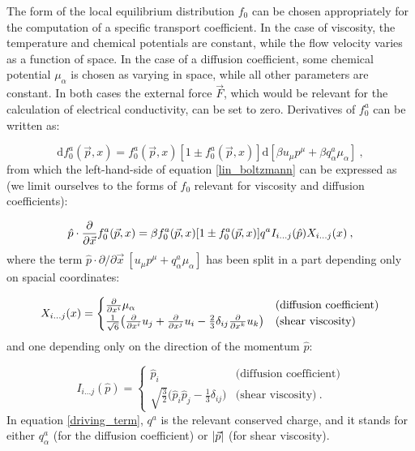 The form of the local equilibrium distribution $f_0$ can be chosen appropriately for the computation of a specific transport coefficient. In the case of viscosity, the temperature and chemical potentials are constant, while the flow velocity varies as a function of space. In the case of a diffusion coefficient, some chemical potential $\mu_{\alpha}$ is chosen as varying in space, while all other parameters are constant. In both cases the external force $\vec F$, which would be relevant for the calculation of electrical conductivity, can be set to zero. Derivatives of $f_0^a$ can be written as:

\begin{equation}
\mathrm d f_0^a(\vec p,x) = f_0^a(\vec p,x) [1 \pm f_0^a(\vec p,x)] \mathrm d [\beta u_{\mu}p^{\mu} + \beta q^a_{\alpha} \mu_{\alpha}] \: ,
\end{equation}
%
from which the left-hand-side of equation \ref{lin_boltzmann} can be expressed as (we limit ourselves to the forms of $f_0$ relevant for viscosity and diffusion coefficients):

\begin{equation}
 \hat p \cdot \frac{\partial  }{\partial \vec x} f^a_0(\vec p, x) = \beta f_0^a(\vec p,x) [1 \pm f_0^a(\vec p,x)] q^a I_{i \dots j} (\hat p) X_{i \dots j} (x) \: ,
\label{driving_term}
\end{equation}
%
where the term $ \hat p \cdot \partial /\partial \vec x \: [u_{\mu}p^{\mu} + q^a_{\alpha} \mu_{\alpha}]$ has been split in a part depending only on spacial coordinates:

\begin{equation}
X_{i \dots j} (x) =
\begin{cases}
\frac{\partial  }{\partial x^i} \mu_{\alpha} & \mbox{(diffusion coefficient)} \\
\frac{1}{\sqrt 6} \bigl( \frac{\partial  }{\partial x^i} u_j + \frac{\partial  }{\partial x^j} u_i -\frac{2}{3} \delta_{ij} \frac{\partial  }{\partial x^k} u_k \bigr) & \mbox{(shear viscosity)}
\end{cases}
\end{equation}
%
and one depending only on the direction of the momentum $\hat p$:

\begin{equation}
I_{i \dots j} (\hat p)=
\begin{cases}
\hat p_i & \mbox{(diffusion coefficient)} \\
\sqrt{\frac{3}{2}} \bigl(\hat p_i \hat p_j - \frac{1}{3}\delta_{ij} \bigr) & \mbox{(shear viscosity)} \: .
\end{cases}
\end{equation}
%
In equation \ref{driving_term}, $q^a$ is the relevant conserved charge, and it stands for either $q^a_{\alpha}$ (for the diffusion coefficient) or $\abs{\vec p}$ (for shear viscosity).

